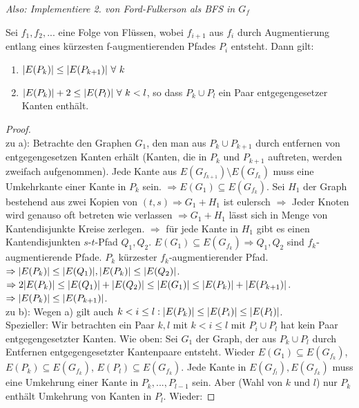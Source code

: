 \textit{Also: Implementiere 2. von Ford-Fulkerson als BFS in $G_f$}
\begin{lemma}
	Sei $f_1, f_2, ...$ eine Folge von Flüssen, wobei $f_{i+1}$ aus $f_i$ durch Augmentierung entlang eines kürzesten f-augmentierenden Pfades $P_i$ entsteht. Dann gilt:
	\begin{enumerate}[label=\alph*)]
		\item $\vert E(P_k) \vert \le \vert E(P_{k+1}) \vert ~\forall~k$
		\item $\vert E(P_k) \vert + 2 \le \vert E(P_l) \vert ~\forall~k<l$, so dass $P_k \cup P_l$ ein Paar entgegengesetzer Kanten enthält.
	\end{enumerate}
\end{lemma}
\begin{proof}~\\
	zu a): Betrachte den Graphen $G_1$, den man aus $P_k \cup P_{k+1}$ durch entfernen von entgegengesetzen Kanten erhält (Kanten, die in $P_k$ und $P_{k+1}$ auftreten, werden zweifach aufgenommen). Jede Kante aus $E(G_{f_{k+1}})\setminus E(G_{f_k})$ muss eine Umkehrkante einer Kante in $P_k$ sein. $\Rightarrow E(G_1) \subseteq E(G_{f_k})$. Sei $H_1$ der Graph bestehend aus zwei Kopien von $(t,s) \Rightarrow G_1 + H_1$ ist eulersch $\Rightarrow$ Jeder Knoten wird genauso oft betreten wie verlassen $\Rightarrow G_1 + H_1$ lässt sich in Menge von Kantendisjunkte Kreise zerlegen. $\Rightarrow$ für jede Kante in $H_1$ gibt es einen Kantendisjunkten $s$-$t$-Pfad  $Q_1, Q_2$. $E(G_1) \subseteq E(G_{f_k}) \Rightarrow Q_1, Q_2$ sind $f_k$-augmentierende Pfade. $P_k$ kürzester $f_k$-augmentierender Pfad.\\
	$\Rightarrow \vert E(P_k) \vert \le \vert E(Q_1) \vert, \vert E(P_k) \vert \le \vert E(Q_2) \vert$.\\
	$\Rightarrow 2\vert E(P_k) \vert \le \vert E(Q_1) \vert + \vert E(Q_2) \vert \le \vert E(G_1) \vert \le \vert E(P_k) \vert + \vert E(P_{k+1}) \vert$.\\
	$\Rightarrow \vert E(P_k) \vert \le \vert E(P_{k+1}) \vert$.\\
	zu b): Wegen a) gilt auch $k < i \le l: \vert E(P_k) \vert \le \vert E(P_i) \vert \le \vert E(P_l) \vert$.\\
	Spezieller: Wir betrachten ein Paar $k,l$ mit $k < i \le l$ mit $P_i \cup P_l$ hat kein Paar entgegengesetzter Kanten. Wie oben: Sei $G_1$ der Graph, der aus $P_k \cup P_l$ durch Entfernen entgegengesetzter Kantenpaare entsteht. Wieder $E(G_1) \subseteq E(G_{f_k})$, $E(P_k) \subseteq E(G_{f_k})$, $E(P_l) \subseteq E(G_{f_k})$. Jede Kante in $E(G_{f_l}), E(G_{f_k})$ muss eine Umkehrung einer Kante in $P_k, ..., P_{l-1}$ sein. Aber (Wahl von $k$ und $l$) nur $P_k$ enthält Umkehrung von Kanten in $P_l$. Wieder:

\end{proof}
